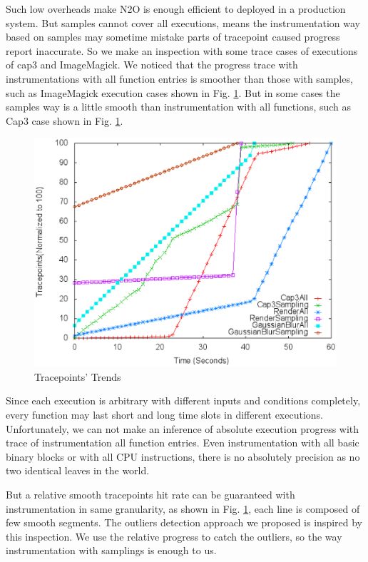 Such low overheads make N2O is enough efficient to deployed in a production system. But samples cannot cover all executions, means the instrumentation way based on samples may sometime mistake parts of tracepoint caused progress report inaccurate. So we make an inspection with some trace cases of executions of cap3 and ImageMagick. We noticed that the progress trace with instrumentations with all function entries is smoother than those with samples, such as ImageMagick execution cases shown in Fig. \ref{figure:tracepoints}. But in some cases the samples way is a little smooth than instrumentation with all functions, such as Cap3 case shown in Fig. \ref{figure:tracepoints}.

\begin{figure}
\centering
\includegraphics[width=0.9\columnwidth]{figures/tracepoints_all_vs_sampling.eps}
\caption{Tracepoints' Trends}
\label{figure:tracepoints}
\end{figure}

Since each execution is arbitrary with different inputs and conditions completely, every function may last short and long time slots in different executions. Unfortunately, we can not make an inference of absolute execution progress with  trace of instrumentation all function entries. Even instrumentation with all basic binary blocks or with all CPU instructions, there is no absolutely precision as no two identical leaves in the world.

But a relative smooth tracepoints hit rate can be guaranteed with instrumentation in same granularity, as shown in Fig.  \ref{figure:tracepoints}, each line is composed of few smooth segments. The outliers detection approach we proposed is inspired by this inspection. We use the relative progress to catch the outliers, so the way instrumentation with samplings is enough to us.

